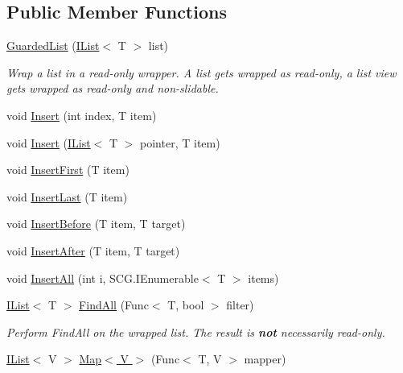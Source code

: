 \subsection*{Public Member Functions}
\begin{DoxyCompactItemize}
\item 
\hyperlink{class_c5_1_1_guarded_list_ae80b0033a55936d85e35dd81c61b9ef8}{Guarded\+List} (\hyperlink{interface_c5_1_1_i_list}{I\+List}$<$ T $>$ list)
\begin{DoxyCompactList}\small\item\em Wrap a list in a read-\/only wrapper. A list gets wrapped as read-\/only, a list view gets wrapped as read-\/only and non-\/slidable. \end{DoxyCompactList}\item 
void \hyperlink{class_c5_1_1_guarded_list_acfdc8f5697d7ad487c9da4c00d15ff4a}{Insert} (int index, T item)
\item 
void \hyperlink{class_c5_1_1_guarded_list_ae15de88d818447d3b25217d1b1298f27}{Insert} (\hyperlink{interface_c5_1_1_i_list}{I\+List}$<$ T $>$ pointer, T item)
\item 
void \hyperlink{class_c5_1_1_guarded_list_a5f5b548fa5704e9a9d83532280a3a0b0}{Insert\+First} (T item)
\item 
void \hyperlink{class_c5_1_1_guarded_list_a0e0d36df19f7bdedf7c9929953381ab5}{Insert\+Last} (T item)
\item 
void \hyperlink{class_c5_1_1_guarded_list_a379efdebd6c5fde83aadf6fd01467a67}{Insert\+Before} (T item, T target)
\item 
void \hyperlink{class_c5_1_1_guarded_list_aeb382caf5b28db625ad150f7ea38511d}{Insert\+After} (T item, T target)
\item 
void \hyperlink{class_c5_1_1_guarded_list_ac87627af2f8b971c1c079e63e64b9953}{Insert\+All} (int i, S\+C\+G.\+I\+Enumerable$<$ T $>$ items)
\item 
\hyperlink{interface_c5_1_1_i_list}{I\+List}$<$ T $>$ \hyperlink{class_c5_1_1_guarded_list_a33bf64be5a6c3affeaba0e652c338811}{Find\+All} (Func$<$ T, bool $>$ filter)
\begin{DoxyCompactList}\small\item\em Perform Find\+All on the wrapped list. The result is {\bfseries not} necessarily read-\/only. \end{DoxyCompactList}\item 
\hyperlink{interface_c5_1_1_i_list}{I\+List}$<$ V $>$ \hyperlink{class_c5_1_1_guarded_list_a383354c45a2b2edd71d58517a1e82920}{Map$<$ V $>$} (Func$<$ T, V $>$ mapper)

\end{DoxyCompactItemize}
